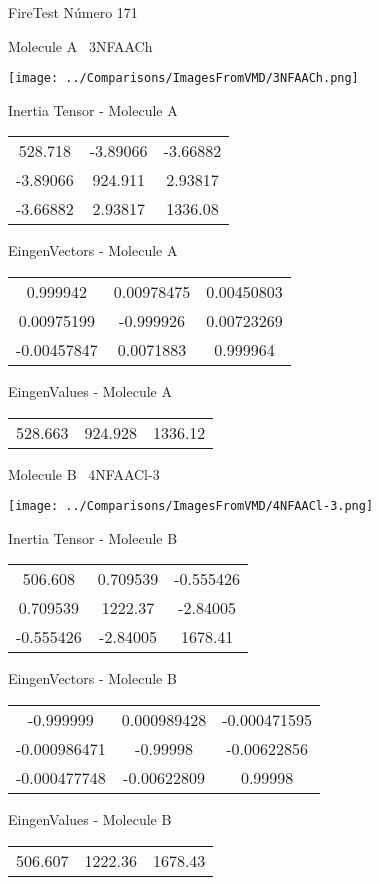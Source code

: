 \vtab[-3cm]
\begin{center}
{\large FireTest \tab Número 171}
\end{center}
\begin{multicols}{2}
\begin{center}

Molecule A \
3NFAACh

\texttt{[image: ../Comparisons/ImagesFromVMD/3NFAACh.png]}

Inertia Tensor - Molecule A \\
\begin{tabular}{|c c c|}
528.718	 & 	-3.89066	 & 	-3.66882	 \\
-3.89066	 & 	924.911	 & 	2.93817	 \\
-3.66882	 & 	2.93817	 & 	1336.08
\end{tabular}

\vtab
 EingenVectors - Molecule A     \\
\begin{tabular}{|c c c|}
0.999942	 & 	0.00978475	 & 	0.00450803	 \\
0.00975199	 & 	-0.999926	 & 	0.00723269	 \\
-0.00457847	 & 	0.0071883	 & 	0.999964
\end{tabular}

\vtab
 EingenValues - Molecule A     \\
\begin{tabular}{|c c c|}
528.663	 & 	924.928	 & 	1336.12	 \\
\end{tabular}
\columnbreak

Molecule B \
4NFAACl-3

\texttt{[image: ../Comparisons/ImagesFromVMD/4NFAACl-3.png]}

Inertia Tensor - Molecule B \\
\begin{tabular}{|c c c|}
506.608	 & 	0.709539	 & 	-0.555426	 \\
0.709539	 & 	1222.37	 & 	-2.84005	 \\
-0.555426	 & 	-2.84005	 & 	1678.41
\end{tabular}

\vtab
 EingenVectors - Molecule B     \\
\begin{tabular}{|c c c|}
-0.999999	 & 	0.000989428	 & 	-0.000471595	 \\
-0.000986471	 & 	-0.99998	 & 	-0.00622856	 \\
-0.000477748	 & 	-0.00622809	 & 	0.99998
\end{tabular}

\vtab
 EingenValues - Molecule B     \\
\begin{tabular}{|c c c|}
506.607	 & 	1222.36	 & 	1678.43	 \\
\end{tabular}

\end{center}
\end{multicols}

